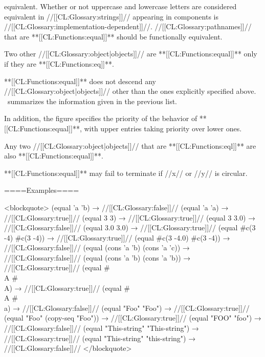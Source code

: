 equivalent. Whether or not uppercase and lowercase letters are considered equivalent in //[[CL:Glossary:strings]]// appearing in components is //[[CL:Glossary:implementation-dependent]]//. //[[CL:Glossary:pathnames]]// that are **[[CL:Functions:equal]]** should be functionally equivalent.


Two other //[[CL:Glossary:object|objects]]// are **[[CL:Functions:equal]]** only if they are **[[CL:Functions:eq]]**.

\endlist

**[[CL:Functions:equal]]** does not descend any //[[CL:Glossary:object|objects]]// other than the ones explicitly specified above. \Thenextfigure\ summarizes the information given in the previous list.

In addition, the figure specifies the priority of the behavior of **[[CL:Functions:equal]]**, with upper entries taking priority over lower ones.


Any two //[[CL:Glossary:object|objects]]// that are **[[CL:Functions:eql]]** are also **[[CL:Functions:equal]]**.

**[[CL:Functions:equal]]** may fail to terminate if //x// or //y// is circular.

====Examples====

<blockquote> (equal 'a 'b) → //[[CL:Glossary:false]]// (equal 'a 'a) → //[[CL:Glossary:true]]// (equal 3 3) → //[[CL:Glossary:true]]// (equal 3 3.0) → //[[CL:Glossary:false]]// (equal 3.0 3.0) → //[[CL:Glossary:true]]// (equal #c(3 -4) #c(3 -4)) → //[[CL:Glossary:true]]// (equal #c(3 -4.0) #c(3 -4)) → //[[CL:Glossary:false]]// (equal (cons 'a 'b) (cons 'a 'c)) → //[[CL:Glossary:false]]// (equal (cons 'a 'b) (cons 'a 'b)) → //[[CL:Glossary:true]]// (equal #\\A #\\A) → //[[CL:Glossary:true]]// (equal #\\A #\\a) → //[[CL:Glossary:false]]// (equal "Foo" "Foo") → //[[CL:Glossary:true]]// (equal "Foo" (copy-seq "Foo")) → //[[CL:Glossary:true]]// (equal "FOO" "foo") → //[[CL:Glossary:false]]// (equal "This-string" "This-string") → //[[CL:Glossary:true]]// (equal "This-string" "this-string") → //[[CL:Glossary:false]]// </blockquote>

